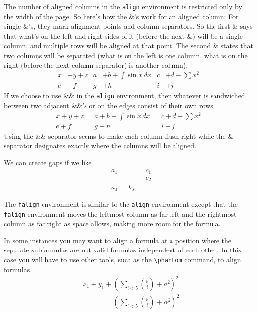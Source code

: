\documentclass[12pt]{amsart}
\begin{document}
The number of aligned columns in the \verb+align+ environment is restricted only by the width of the page. So here's how the \&'s work for an aligned column: For single \&'s, they mark alignment points and column separators. So the first \& says that what's on the left and right sides of it (before the next \&) will be a single column, and multiple rows will be aligned at that point. The second \& states that two columns will be separated (what is on the left is one column, what is on the right (before the next column separator) is another column). 
\begin{align*}
   x &+y + z & a &+b + \int \sin x \, dx& c &+d - \sum x^2 \\
   e &+f & g &+h & i &+ j
\end{align*}
If we choose to use \&\& in the \verb+align+ environment, then whatever is sandwiched between two adjacent \&\&'s or on the edges consist of their own rows
\begin{align*}
   x + y + z && a + b + \int \sin x \, dx&& c + d - \sum x^2 \\
   e + f && g + h && i + j 
\end{align*}
Using the \&\& separator seems to make each column flush right while the \& separator designates exactly where the columns will be aligned.

We can create gaps if we like
\begin{align*}
   &    a_1 &	&	& 	& c_1 \\
   &           &	&	&	& c_2 \\
   &   a_3  &     & b_3	& 	&
\end{align*}

The \texttt{falign} environment is similar to the \texttt{align} environment except that the \texttt{falign} environment moves the leftmost column as far left and the rightmost column as far right as space allows, making more room for the formula.

In some instances you may want to align a formula at a position where the separate subformulas are not valid formulas independent of each other. In this case you will have to use other tools, such as the \verb+\phantom+ command, to align formulas. 
\begin{align*}
   &x_{1} + y_{1} + \left( \sum_{i < 5} \binom{5}{i}
      + a^{2} \right)^{2}\\
   &\phantom{x_{1} + y_{1} + {}}
      \left( \sum_{i < 5} \binom{5}{i} + \alpha^{2}
      \right)^{2}
\end{align*}
\vspace{15 pt}
\end{document}
